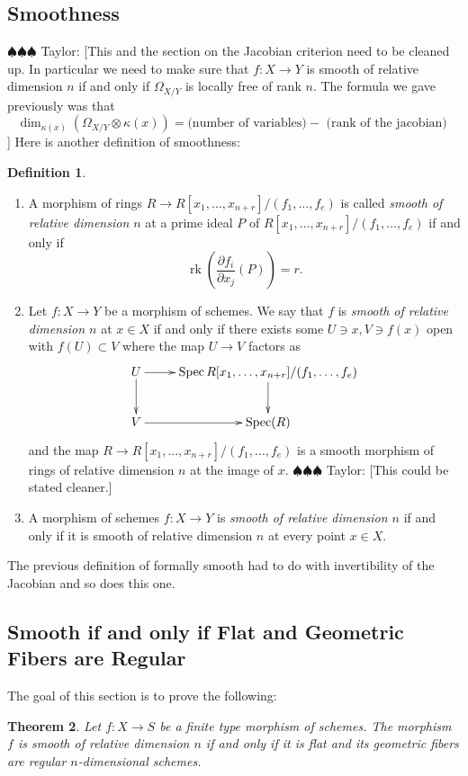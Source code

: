 \documentclass[12pt]{article}
\numberwithin{equation}{section}
\newtheorem{theorem}{Theorem}[subsection]
\theoremstyle{definition}
\newtheorem{definition}[theorem]{Definition}
\theoremstyle{remark}
\newcommand{\Spec}{\operatorname{Spec}}
\newcommand{\rk}{\operatorname{rk}}
\newcommand{\taylor}[1]{{\color{blue} \sf $\spadesuit\spadesuit\spadesuit$ Taylor: [#1]}}
\begin{document}
\subsection{Smoothness}
\taylor{This and the section on the Jacobian criterion need to be cleaned up. 
In particular we need to make sure that $f:X \to Y$ is smooth of relative dimension $n$ if and only if $\Omega_{X/Y}$ is locally free of rank $n$. 
The formula we gave previously was that 
 $$ \dim_{\kappa(x)}(\Omega_{X/Y}\otimes \kappa(x)) = \mbox{(number of variables)} - \mbox{ (rank of the jacobian) } $$
}
Here is another definition of smoothness:
\begin{definition}
	\begin{enumerate}
		\item A morphism of rings $R \to R[x_1,\ldots,x_{n+r}]/(f_1,\ldots,f_e)$ is called \emph{smooth of relative dimension $n$} at a prime ideal $P$ of $R[x_1,\ldots,x_{n+r}]/(f_1,\ldots,f_e)$ if and only if 
		$$\rk( \dfrac{\partial f_i}{\partial x_j}(P) ) = r. $$
		\item Let $f:X\to Y$ be a morphism of schemes. 
		We say that $f$ is \emph{smooth of relative dimension $n$} at $x\in X$ if and only if there exists some $U \owns x, V\owns f(x)$ open with $f(U)\subset V$ where the map $U\to V$ factors as 
		$$
		\xymatrix{
			U \ar[r] \ar[d] & \Spec R[x_1,\ldots, x_{n+r}]/(f_1,\ldots,f_e) \ar[d] \\
			V \ar[r] & \Spec(R) 
		}
		$$
		and the map $R \to R[x_1,\ldots,x_{n+r}]/(f_1,\ldots,f_e)$ is a smooth morphism of rings of relative dimension $n$ at the image of $x$. \taylor{This could be stated cleaner.}
		\item A morphism of schemes $f:X\to Y$ is \emph{smooth of relative dimension $n$} if and only if it is smooth of relative dimension $n$ at every point $x\in X$.
	\end{enumerate}
\end{definition}
The previous definition of formally smooth had to do with invertibility of the Jacobian and so does this one. 

\subsection{Smooth if and only if Flat and Geometric Fibers are Regular}

The goal of this section is to prove the following:
\begin{theorem}
	Let $f:X\to S$ be a finite type morphism of schemes. 
	The morphism $f$ is smooth of relative dimension $n$ if and only if it is flat and its geometric fibers are regular $n$-dimensional schemes.
\end{theorem}
\end{document}
